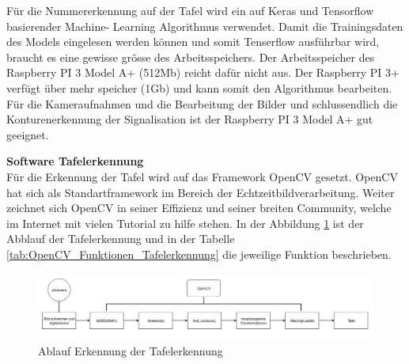 \documentclass[../../main.tex]{subfiles}
\begin{document}
    Für die Nummererkennung auf der Tafel wird ein auf Keras und Tensorflow basierender Machine- Learning Algorithmus verwendet. Damit die Trainingsdaten des Models eingelesen werden können und somit Tenserflow ausführbar wird, braucht es eine gewisse grösse des Arbeitsspeichers. Der Arbeitsspeicher des Raspberry PI 3 Model A+ (512Mb) reicht dafür nicht aus. Der Raspberry PI 3+ verfügt über mehr speicher (1Gb) und kann somit den Algorithmus bearbeiten. Für die Kameraufnahmen und die Bearbeitung der Bilder und schlussendlich die Konturenerkennung der Signalisation ist der Raspberry PI 3 Model A+  gut geeignet.
    \pagebreak

    \textbf{Software Tafelerkennung}\\
    Für die Erkennung der Tafel wird auf das Framework OpenCV gesetzt. OpenCV hat sich als Standartframework im Bereich der Echtzeitbildverarbeitung. Weiter zeichnet sich OpenCV in seiner Effizienz und seiner breiten Community, welche im Internet mit vielen Tutorial zu hilfe stehen. In der Abbildung \ref{fig:ablauf_tafelerkennung} ist der Abblauf der Tafelerkennung und in der Tabelle \ref{tab:OpenCV_Funktionen_Tafelerkennung} die jeweilige Funktion beschrieben.



    \begin{figure}[H] %
        \centering
        \includegraphics[width=1\textwidth]{Ablauf_Tafelerkennung.png}
        \caption{Ablauf Erkennung der Tafelerkennung}
        \label{fig:ablauf_tafelerkennung}
    \end{figure}
\end{document}

